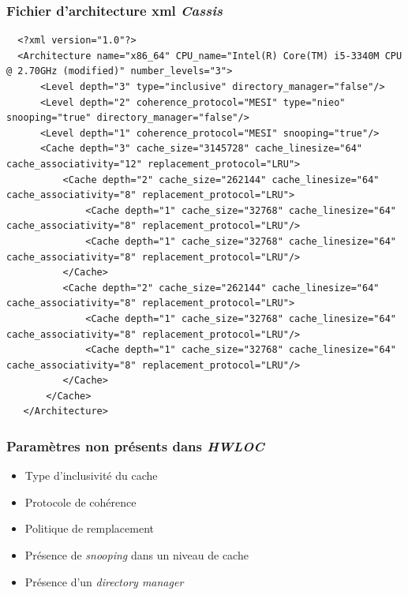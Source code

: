 \begin{frame}[fragile]
  \frametitle{Fichier d'architecture xml \emph{Cassis}}
  \begin{lstlisting}
  <?xml version="1.0"?>
  <Architecture name="x86_64" CPU_name="Intel(R) Core(TM) i5-3340M CPU @ 2.70GHz (modified)" number_levels="3">
      <Level depth="3" type="inclusive" directory_manager="false"/>
      <Level depth="2" coherence_protocol="MESI" type="nieo" snooping="true" directory_manager="false"/>
      <Level depth="1" coherence_protocol="MESI" snooping="true"/>
      <Cache depth="3" cache_size="3145728" cache_linesize="64" cache_associativity="12" replacement_protocol="LRU">
          <Cache depth="2" cache_size="262144" cache_linesize="64" cache_associativity="8" replacement_protocol="LRU">
              <Cache depth="1" cache_size="32768" cache_linesize="64" cache_associativity="8" replacement_protocol="LRU"/>
              <Cache depth="1" cache_size="32768" cache_linesize="64" cache_associativity="8" replacement_protocol="LRU"/>
          </Cache>
          <Cache depth="2" cache_size="262144" cache_linesize="64" cache_associativity="8" replacement_protocol="LRU">
              <Cache depth="1" cache_size="32768" cache_linesize="64" cache_associativity="8" replacement_protocol="LRU"/>
              <Cache depth="1" cache_size="32768" cache_linesize="64" cache_associativity="8" replacement_protocol="LRU"/>
          </Cache>
       </Cache>
   </Architecture>
  \end{lstlisting}
\end{frame}

\begin{frame}
  \frametitle{Paramètres non présents dans \emph{HWLOC}}
  \begin{itemize}
  \item<1-> Type d'inclusivité du cache 
  \item<1-> Protocole de cohérence 
  \item<1-> Politique de remplacement 
  \item<1-> Présence de \textit{snooping} dans un niveau de cache 
  \item<1-> Présence d'un \textit{directory manager} 
  \end{itemize}
\end{frame}

